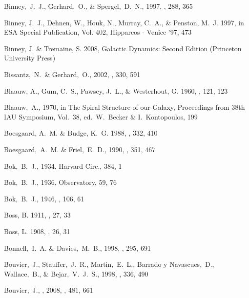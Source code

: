 \begin{thebibliography}{99}
  Binney,~J.~J., Gerhard,~O., \& Spergel,~D.~N., 1997,
  \mnras, 288, 365

{Binney}, J.~J., {Dehnen}, W., {Houk}, N., {Murray}, C.~A., \& {Penston}, M.~J.
  1997, in ESA Special Publication, Vol. 402, Hipparcos - Venice '97, 473

{Binney}, J. \& {Tremaine}, S. 2008, {Galactic Dynamics: Second Edition}
  (Princeton University Press)

  Bissantz,~N.~\& Gerhard,~O., 2002,
  \mnras, 330, 591

{Blaauw}, A., {Gum}, C.~S., {Pawsey}, J.~L., \& {Westerhout}, G. 1960, \mnras,
  121, 123

  Blaauw,~A., 1970, in The Spiral Structure of our Galaxy, Proceedings from 38th IAU Symposium, Vol.~38, ed.~W.~Becker \& I.~Kontopoulos, 199

{Boesgaard}, A.~M. \& {Budge}, K.~G. 1988, \apj, 332, 410

  Boesgaard,~A.~M. \& Friel,~E.~D., 1990,
  \apj, 351, 467

  Bok,~B.~J., 1934,
  Harvard Circ., 384, 1

  Bok,~B.~J., 1936,
  Observatory, 59, 76

  Bok,~B.~J., 1946,
  \mnras, 106, 61

{Boss}, B. 1911, \aj, 27, 33

{Boss}, L. 1908, \aj, 26, 31

  Bonnell,~I.~A. \& Davies,~M.~B., 1998,
  \mnras, 295, 691

  Bouvier,~J., Stauffer,~J.~R., Martin,~E.~L., Barrado y Navascues,~D., Wallace,~B., \& Bejar,~V.~J.~S., 1998,
  \aap, 336, 490

  Bouvier,~J., \etal, 2008,
  \aap, 481, 661


\end{thebibliography}

